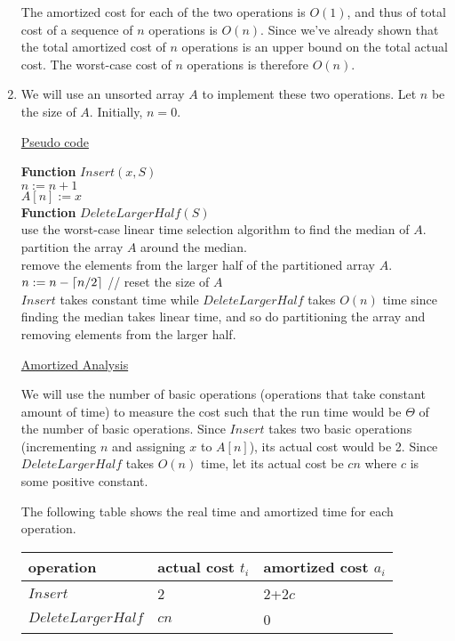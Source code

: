 \documentclass[11pt]{article}
\DeclarePairedDelimiter\ceil{\lceil}{\rceil}
\begin{document}
\begin{enumerate}
The amortized cost for each of the two operations is $O(1)$, and thus
of total cost of a sequence of $n$ operations is $O(n)$. Since we've
already shown that the total amortized cost of $n$ operations is an
upper bound on the total actual cost. The worst-case cost of $n$
operations is therefore $O(n)$. 

\item %
  We will use an unsorted array $A$ to implement these two
  operations. Let $n$ be the size of $A$. Initially, $n=0$.

\underline{Pseudo code}

\textbf{Function} $Insert(x,S)$\\
\-\hspace{2em} $n := n + 1$\\
\-\hspace{2em} $A[n] := x$\\

\textbf{Function} $DeleteLargerHalf(S)$\\
\-\hspace{2em} use the worst-case linear time selection algorithm to
find the median of $A$.\\
\-\hspace{2em} partition the array $A$ around the median.\\
\-\hspace{2em} remove the elements from the larger half of the
partitioned array $A$.\\
\-\hspace{2em} $n := n - \ceil{n/2}$ // reset the size of $A$\\

$Insert$ takes constant time while $DeleteLargerHalf$ takes $O(n)$
time since finding the median takes linear time, and so do
partitioning the array and removing elements from the larger half. 

\underline{Amortized Analysis}

We will use the number of basic operations (operations that take constant amount
of time) to measure the cost such that the run time would be $\Theta$
of the number of basic operations. Since $Insert$ takes two basic
operations (incrementing $n$ and assigning $x$ to $A[n]$), its actual
cost would be 2. Since $DeleteLargerHalf$ takes $O(n)$ time, let its
actual cost be $cn$ where $c$ is some positive constant. 

The following table shows the real time and amortized time for each
operation. 

\begin{tabular}{ l l l  }
  operation & actual cost $t_i$ & amortized cost $a_i$ \\ \hline
  $Insert$ & 2 & 2+2$c$ \\
  $DeleteLargerHalf$ & $cn$ & 0
\end{tabular}


\end{enumerate}
\end{document}
